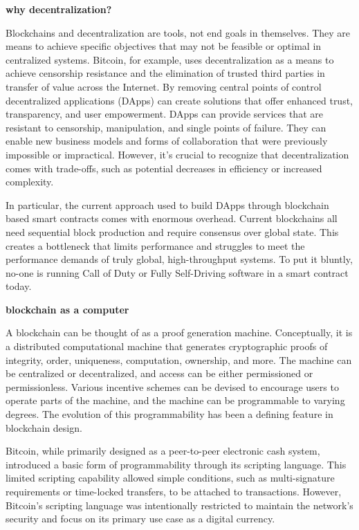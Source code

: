 \documentclass{article}
\begin{document}
\textbf{why decentralization?}
\vspace{2mm}

Blockchains and decentralization are tools, not end goals in themselves. They are means to achieve specific objectives that may not be feasible or optimal in centralized systems. Bitcoin, for example, uses decentralization as a means to achieve censorship resistance and the elimination of trusted third parties in transfer of value across the Internet. By removing central points of control decentralized applications (DApps) can create solutions that offer enhanced trust, transparency, and user empowerment. DApps can provide services that are resistant to censorship, manipulation, and single points of failure. They can enable new business models and forms of collaboration that were previously impossible or impractical. However, it's crucial to recognize that decentralization comes with trade-offs, such as potential decreases in efficiency or increased complexity.
\vspace{2mm}

In particular, the current approach used to build DApps through blockchain based smart contracts comes with enormous overhead. Current blockchains all need sequential block production and require consensus over global state.  This creates a bottleneck that limits performance and struggles to meet the performance demands of truly global, high-throughput systems. To put it bluntly, no-one is running Call of Duty or Fully Self-Driving software in a smart contract today.

\vspace{2mm}
\textbf{blockchain as a computer}
\vspace{2mm}

A blockchain can be thought of as a proof generation machine. Conceptually, it is a distributed computational machine that generates cryptographic proofs of integrity, order, uniqueness, computation, ownership, and more. The machine can be centralized or decentralized, and access can be either permissioned or permissionless. Various incentive schemes can be devised to encourage users to operate parts of the machine, and the machine can be programmable to varying degrees. The evolution of this programmability has been a defining feature in blockchain design.
\vspace{2mm}

Bitcoin, while primarily designed as a peer-to-peer electronic cash system, introduced a basic form of programmability through its scripting language. This limited scripting capability allowed simple conditions, such as multi-signature requirements or time-locked transfers, to be attached to transactions. However, Bitcoin's scripting language was intentionally restricted to maintain the network's security and focus on its primary use case as a digital currency.
\end{document}
